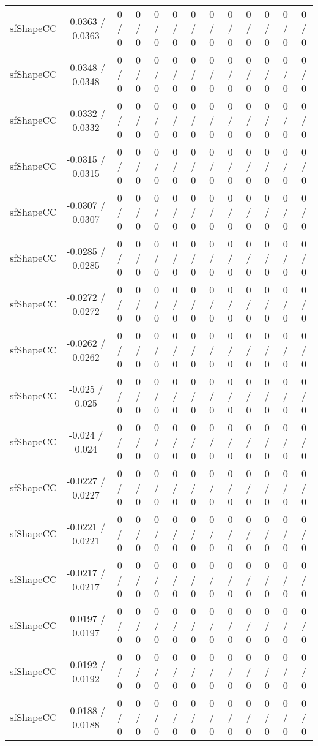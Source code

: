 \documentclass[10pt]{article}
\begin{document}
\begin{table}[htbp]
\begin{center}
\begin{tabular}{|c|c|c|c|c|c|c|c|c|c|c|c|c|}
  sfShapeCC & -0.0363 / 0.0363 & 0 / 0 & 0 / 0 & 0 / 0 & 0 / 0 & 0 / 0 & 0 / 0 & 0 / 0 & 0 / 0 & 0 / 0 & 0 / 0 & 0 / 0 \\ 
  sfShapeCC & -0.0348 / 0.0348 & 0 / 0 & 0 / 0 & 0 / 0 & 0 / 0 & 0 / 0 & 0 / 0 & 0 / 0 & 0 / 0 & 0 / 0 & 0 / 0 & 0 / 0 \\ 
  sfShapeCC & -0.0332 / 0.0332 & 0 / 0 & 0 / 0 & 0 / 0 & 0 / 0 & 0 / 0 & 0 / 0 & 0 / 0 & 0 / 0 & 0 / 0 & 0 / 0 & 0 / 0 \\ 
  sfShapeCC & -0.0315 / 0.0315 & 0 / 0 & 0 / 0 & 0 / 0 & 0 / 0 & 0 / 0 & 0 / 0 & 0 / 0 & 0 / 0 & 0 / 0 & 0 / 0 & 0 / 0 \\ 
  sfShapeCC & -0.0307 / 0.0307 & 0 / 0 & 0 / 0 & 0 / 0 & 0 / 0 & 0 / 0 & 0 / 0 & 0 / 0 & 0 / 0 & 0 / 0 & 0 / 0 & 0 / 0 \\ 
  sfShapeCC & -0.0285 / 0.0285 & 0 / 0 & 0 / 0 & 0 / 0 & 0 / 0 & 0 / 0 & 0 / 0 & 0 / 0 & 0 / 0 & 0 / 0 & 0 / 0 & 0 / 0 \\ 
  sfShapeCC & -0.0272 / 0.0272 & 0 / 0 & 0 / 0 & 0 / 0 & 0 / 0 & 0 / 0 & 0 / 0 & 0 / 0 & 0 / 0 & 0 / 0 & 0 / 0 & 0 / 0 \\ 
  sfShapeCC & -0.0262 / 0.0262 & 0 / 0 & 0 / 0 & 0 / 0 & 0 / 0 & 0 / 0 & 0 / 0 & 0 / 0 & 0 / 0 & 0 / 0 & 0 / 0 & 0 / 0 \\ 
  sfShapeCC & -0.025 / 0.025 & 0 / 0 & 0 / 0 & 0 / 0 & 0 / 0 & 0 / 0 & 0 / 0 & 0 / 0 & 0 / 0 & 0 / 0 & 0 / 0 & 0 / 0 \\ 
  sfShapeCC & -0.024 / 0.024 & 0 / 0 & 0 / 0 & 0 / 0 & 0 / 0 & 0 / 0 & 0 / 0 & 0 / 0 & 0 / 0 & 0 / 0 & 0 / 0 & 0 / 0 \\ 
  sfShapeCC & -0.0227 / 0.0227 & 0 / 0 & 0 / 0 & 0 / 0 & 0 / 0 & 0 / 0 & 0 / 0 & 0 / 0 & 0 / 0 & 0 / 0 & 0 / 0 & 0 / 0 \\ 
  sfShapeCC & -0.0221 / 0.0221 & 0 / 0 & 0 / 0 & 0 / 0 & 0 / 0 & 0 / 0 & 0 / 0 & 0 / 0 & 0 / 0 & 0 / 0 & 0 / 0 & 0 / 0 \\ 
  sfShapeCC & -0.0217 / 0.0217 & 0 / 0 & 0 / 0 & 0 / 0 & 0 / 0 & 0 / 0 & 0 / 0 & 0 / 0 & 0 / 0 & 0 / 0 & 0 / 0 & 0 / 0 \\ 
  sfShapeCC & -0.0197 / 0.0197 & 0 / 0 & 0 / 0 & 0 / 0 & 0 / 0 & 0 / 0 & 0 / 0 & 0 / 0 & 0 / 0 & 0 / 0 & 0 / 0 & 0 / 0 \\ 
  sfShapeCC & -0.0192 / 0.0192 & 0 / 0 & 0 / 0 & 0 / 0 & 0 / 0 & 0 / 0 & 0 / 0 & 0 / 0 & 0 / 0 & 0 / 0 & 0 / 0 & 0 / 0 \\ 
  sfShapeCC & -0.0188 / 0.0188 & 0 / 0 & 0 / 0 & 0 / 0 & 0 / 0 & 0 / 0 & 0 / 0 & 0 / 0 & 0 / 0 & 0 / 0 & 0 / 0 & 0 / 0 \\ 

\end{tabular}
\end{center}
\end{table}
\end{document}
